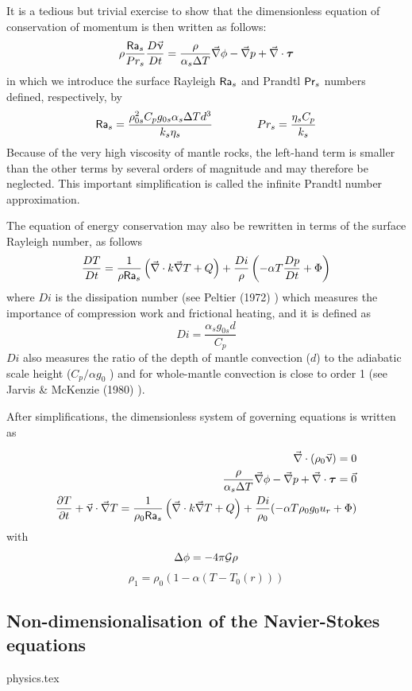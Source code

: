 It is a tedious but trivial exercise to show that the dimensionless equation of 
conservation of momentum is then written as follows:
\[
\rho \frac{{\mathsf{Ra}}_s}{Pr_s} \frac{D\vec\upnu}{Dt} =
\frac{\rho}{\alpha_s \Delta T} \vec\nabla \phi - \vec\nabla p + \vec\nabla \cdot {\bm \tau}
\]
in which we introduce the surface Rayleigh ${\mathsf{Ra}}_s$ and Prandtl ${\mathsf{Pr}}_s$ numbers defined, 
respectively, by
\[
{\mathsf{Ra}}_s=\frac{\rho_{0s}^2 C_p g_{0s} \alpha_s \Delta T d^3}{k_s \eta_s}
\qquad
\qquad
Pr_s= \frac{\eta_s C_p}{k_s}
\]
Because of the very high viscosity of mantle rocks, the left-hand term 
is smaller than the other terms by several orders of magnitude
and may therefore be neglected. This important simplification is called the 
infinite Prandtl number approximation. 

The equation of energy conservation may also be rewritten in terms of the surface Rayleigh number, as follows
\[
\frac{D T}{D t} = \frac{1}{\rho {\mathsf{Ra}}_s} \left( \vec\nabla\cdot k\vec\nabla T + Q \right) 
+\frac{Di}{\rho} \left( -\alpha T \frac{Dp}{Dt} + \Phi  \right)
\]
where $Di$ is the dissipation number (see Peltier (1972) \cite{pelt72}) 
which measures the importance of compression work and frictional heating, and it is defined
as 
\[
Di=\frac{\alpha_s g_{0s} d}{C_p}
\]
$Di$ also measures the ratio of the depth of mantle convection ($d$) to 
the adiabatic scale height ($C_p/\alpha g_0$ ) and for whole-mantle convection is
close to order 1 (see Jarvis \& McKenzie (1980) \cite{jamc80}).

After simplifications, the dimensionless system of governing equations is written as

\begin{eqnarray}
\vec\nabla\cdot(\rho_0 \vec\upnu) =0 \\
\frac{\rho}{\alpha_s \Delta T} \vec\nabla \phi - \vec\nabla p + \vec\nabla \cdot {\bm \tau} = \vec{0} \\
\frac{\partial T}{\partial t} + \vec\upnu\cdot\vec\nabla T =  
\frac{1}{\rho_0 {\mathsf{Ra}}_s} \left( \vec\nabla\cdot k\vec\nabla T + Q \right) +
\frac{Di}{\rho_0} (-\alpha T \rho_0 g_0 u_r + \Phi) 
\end{eqnarray}
with 
\[
\Delta \phi = -4\pi {\cal G} \rho
\]
\[
\rho_1=\rho_0(1-\alpha(T-T_0(r)))
\]

\subsection{Non-dimensionalisation of the Navier-Stokes equations}\label{ss:nondim}
\begin{flushright} {\tiny {\color{gray} physics.tex}} \end{flushright}

